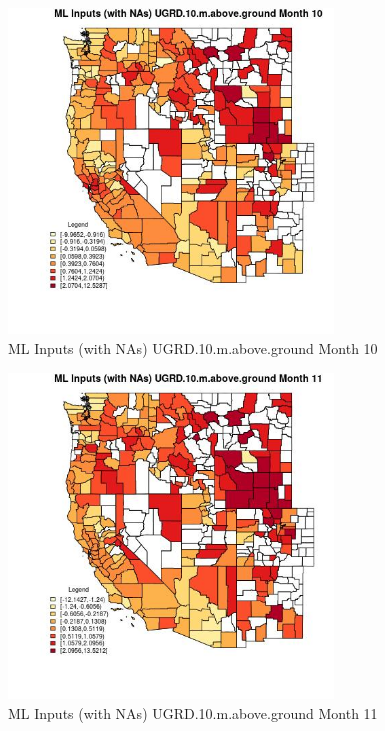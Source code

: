 \begin{figure} 
\centering  
\includegraphics[width=0.77\textwidth]{Code_Outputs/Report_ML_input_PM25_Step4_part_f_de_duplicated_aveswNAs_CountyUGRD10mabovegroundmedianMonth10.jpg} 
\caption{\label{fig:Report_ML_input_PM25_Step4_part_f_de_duplicated_aveswNAsCountyUGRD10mabovegroundmedianMonth10}ML Inputs (with NAs) UGRD.10.m.above.ground Month 10} 
\end{figure} 
 

\begin{figure} 
\centering  
\includegraphics[width=0.77\textwidth]{Code_Outputs/Report_ML_input_PM25_Step4_part_f_de_duplicated_aveswNAs_CountyUGRD10mabovegroundmedianMonth11.jpg} 
\caption{\label{fig:Report_ML_input_PM25_Step4_part_f_de_duplicated_aveswNAsCountyUGRD10mabovegroundmedianMonth11}ML Inputs (with NAs) UGRD.10.m.above.ground Month 11} 
\end{figure} 
 

